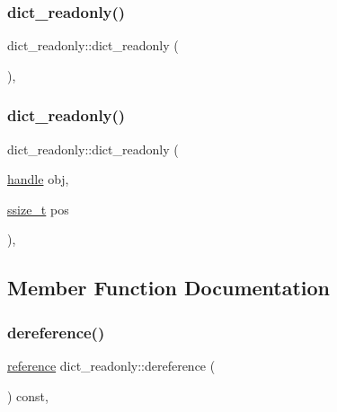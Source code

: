 \subsubsection{\texorpdfstring{dict\_readonly()}{dict\_readonly()}\hspace{0.1cm}{\footnotesize\ttfamily [1/2]}}
{\footnotesize\ttfamily dict\+\_\+readonly\+::dict\+\_\+readonly (\begin{DoxyParamCaption}{ }\end{DoxyParamCaption})\hspace{0.3cm}{\ttfamily [protected]}, {\ttfamily [default]}}

\mbox{\label{classdict__readonly_a53cb6c65507a2455c3eff4e3e43cc048}} 
\subsubsection{\texorpdfstring{dict\_readonly()}{dict\_readonly()}\hspace{0.1cm}{\footnotesize\ttfamily [2/2]}}
{\footnotesize\ttfamily dict\+\_\+readonly\+::dict\+\_\+readonly (\begin{DoxyParamCaption}\item[{\mbox{\hyperlink{classhandle}{handle}}}]{obj,  }\item[{\mbox{\hyperlink{detail_2common_8h_ac430d16fc097b3bf0a7469cfd09decda}{ssize\+\_\+t}}}]{pos }\end{DoxyParamCaption})\hspace{0.3cm}{\ttfamily [inline]}, {\ttfamily [protected]}}



\subsection{Member Function Documentation}
\mbox{\label{classdict__readonly_a28eef7ab54bace49d245676429d91830}} 
\subsubsection{\texorpdfstring{dereference()}{dereference()}}
{\footnotesize\ttfamily \mbox{\hyperlink{classdict__readonly_a84d59082eaadc1ea6eb819992cc74f0e}{reference}} dict\+\_\+readonly\+::dereference (\begin{DoxyParamCaption}{ }\end{DoxyParamCaption}) const\hspace{0.3cm}{\ttfamily [inline]}, {\ttfamily [protected]}}

